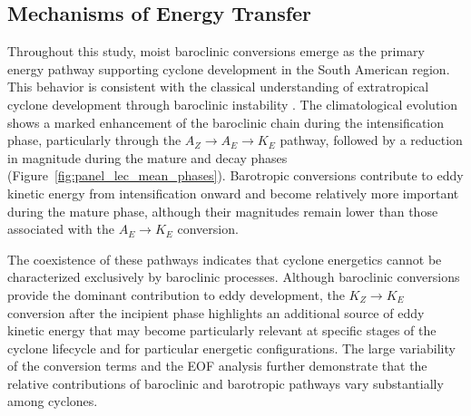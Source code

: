 \documentclass[pdflatex,sn-chicago]{sn-jnl}%
\theoremstyle{plain}
\theoremstyle{definition}
\theoremstyle{remark}
\theoremstyle{definition}
\begin{document}
\subsection{Mechanisms of Energy Transfer}

Throughout this study, moist baroclinic conversions emerge as the primary energy pathway supporting cyclone development in the South American region. This behavior is consistent with the classical understanding of extratropical cyclone development through baroclinic instability \citep{bjerknes1922life,charney1964growth,hoskins1990existence}. The climatological evolution shows a marked enhancement of the baroclinic chain during the intensification phase, particularly through the $A_Z \rightarrow A_E \rightarrow K_E$ pathway, followed by a reduction in magnitude during the mature and decay phases (Figure~\ref{fig:panel_lec_mean_phases}). Barotropic conversions contribute to eddy kinetic energy from intensification onward and become relatively more important during the mature phase, although their magnitudes remain lower than those associated with the $A_E \rightarrow K_E$ conversion.

The coexistence of these pathways indicates that cyclone energetics cannot be characterized exclusively by baroclinic processes. Although baroclinic conversions provide the dominant contribution to eddy development, the $K_Z \rightarrow K_E$ conversion after the incipient phase highlights an additional source of eddy kinetic energy that may become particularly relevant at specific stages of the cyclone lifecycle and for particular energetic configurations. The large variability of the conversion terms and the EOF analysis further demonstrate that the relative contributions of baroclinic and barotropic pathways vary substantially among cyclones.
\end{document}
